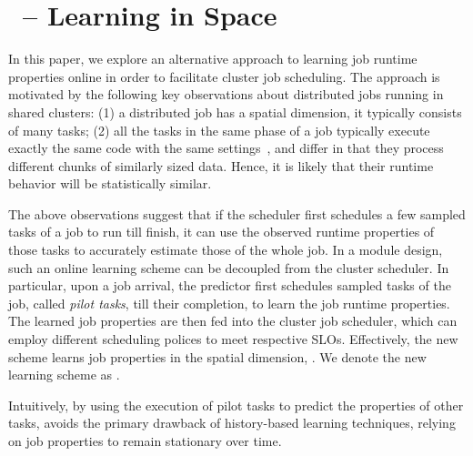\section{\lTechnique\ -- Learning in Space}
\label{sec:sampling}

In this paper, we explore an alternative approach to learning job runtime
properties online in order to facilitate cluster job scheduling.  The approach
is motivated by the following
key observations about distributed jobs running in shared clusters: (1) a
distributed job has a spatial dimension, \ie it typically consists of many
tasks; (2) all the tasks in the same phase of a job typically execute exactly
the same code with the same settings~\cite{googleClusterData2011-2Schema,
personalCommunication:MarkAstley,googleClusterData2019Schema}, 
and  differ in that they process different
chunks of similarly sized data. 
Hence, it is likely that their runtime behavior
will be statistically similar.

The above observations suggest that if the scheduler first schedules a few
sampled tasks of a job to run till finish, it can use the observed runtime
properties of those tasks to accurately estimate those of the whole job. 
In a module design, such an online learning scheme can be decoupled from the
cluster scheduler.  In particular, upon a job arrival, the predictor first
schedules sampled tasks of the job, called {\em pilot tasks}, till their
completion, to learn the job runtime properties. The learned job properties are
then fed into the cluster job scheduler, which can employ different scheduling
polices to meet respective SLOs.  Effectively, the new scheme learns job
properties in the spatial dimension, .  We denote
the new learning scheme  as \lTechnique.


Intuitively, by using the execution of pilot tasks to predict the properties of
other tasks, \lTechnique avoids the primary drawback of history-based learning
techniques, \ie relying on job properties to remain stationary over time.

